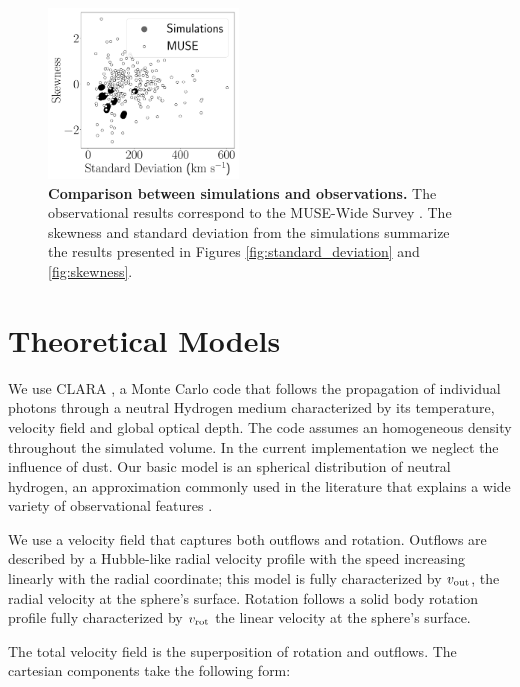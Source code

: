 \documentclass[a4paper,fleqn,usenatbib]{mnras}
\begin{document}
\begin{figure}
\centering
\includegraphics[width=0.45\textwidth]{muse_vs_simulations.pdf}

\caption{\textbf{Comparison between simulations and observations.}  
The observational results correspond to the MUSE-Wide Survey
\citep{2017A&A...606A..12H}. The skewness and standard deviation from
the simulations summarize the results presented in Figures
\ref{fig:standard_deviation} and \ref{fig:skewness}.
  \label{fig:muse}}
\end{figure}


\section{Theoretical Models}
\label{sec:theory}


We use CLARA \citep{CLARA}, a Monte Carlo code that follows the
propagation of individual photons through a neutral Hydrogen medium
characterized by its temperature, velocity field and global optical depth.
The code assumes an homogeneous density throughout the simulated volume.
In the current implementation we neglect the influence of dust.
Our basic model is an spherical distribution of neutral hydrogen,
an approximation commonly used in the literature that explains a
wide variety of observational features
\citep{Ahn03,Verhamme06,Dijkstra06}. 

We use a velocity field that captures both outflows and rotation.
Outflows are described by a Hubble-like radial velocity profile with
the speed increasing linearly with the radial coordinate; this model
is fully characterized by $v_{\rm out}$, the radial velocity at the
sphere's surface. 
Rotation follows a solid body rotation profile fully characterized by
$v_{\rm rot}$ the linear velocity at the sphere's surface.  

The total velocity field is the superposition of rotation and
outflows.
The cartesian components take the following form:
\end{document}
